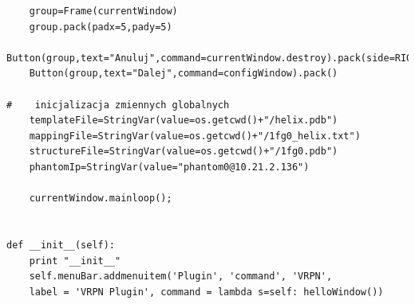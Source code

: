\documentclass[licencjacka]{pracamgr}
\begin{document}
\begin{lstlisting}
    group=Frame(currentWindow)
    group.pack(padx=5,pady=5)
    Button(group,text="Anuluj",command=currentWindow.destroy).pack(side=RIGHT)
    Button(group,text="Dalej",command=configWindow).pack()
    
#    inicjalizacja zmiennych globalnych    
    templateFile=StringVar(value=os.getcwd()+"/helix.pdb")
    mappingFile=StringVar(value=os.getcwd()+"/1fg0_helix.txt")
    structureFile=StringVar(value=os.getcwd()+"/1fg0.pdb")
    phantomIp=StringVar(value="phantom0@10.21.2.136")
    
    currentWindow.mainloop();
    
    
def __init__(self):
    print "__init__"
    self.menuBar.addmenuitem('Plugin', 'command', 'VRPN',
	label = 'VRPN Plugin', command = lambda s=self: helloWindow())
                             
\end{lstlisting}
\end{document}
